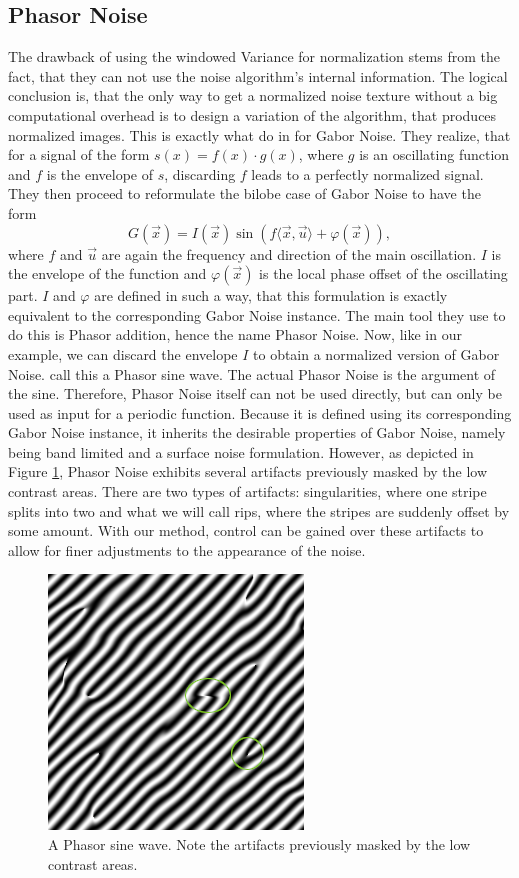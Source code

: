 \documentclass{utue} %
\begin{document}
\subsection{Phasor Noise}\label{sec:phasorNoise}
The drawback of using the windowed Variance for normalization stems from the fact, that they can not use the noise algorithm's internal information. The logical conclusion is, that the only way to get a normalized noise texture without a big computational overhead is to design a variation of the algorithm, that produces normalized images. This is exactly what \citeauthor{phasorNoise} do in \cite{phasorNoise} for Gabor Noise. They realize, that for a signal of the form $s(x) = f(x)\cdot g(x)$, where $g$ is an oscillating function and $f$ is the envelope of $s$, discarding $f$ leads to a perfectly normalized signal. They then proceed to reformulate the bilobe case of Gabor Noise to have the form
$$
G(\vec{x}) = I(\vec{x})\sin{(f\langle\vec{x},\vec{u}\rangle + \varphi(\vec{x}))},
$$
where $f$ and $\vec{u}$ are again the frequency and direction of the main oscillation. $I$ is the envelope of the function and $\varphi(\vec{x})$ is the local phase offset of the oscillating part. $I$ and $\varphi$ are defined in such a way, that this formulation is exactly equivalent to the corresponding Gabor Noise instance. The main tool they use to do this is Phasor addition, hence the name Phasor Noise. Now, like in our example, we can discard the envelope $I$ to obtain a normalized version of Gabor Noise. \citeauthor{phasorNoise} call this a Phasor sine wave. The actual Phasor Noise is the argument of the sine. Therefore, Phasor Noise itself can not be used directly, but can only be used as input for a periodic function. Because it is defined using its corresponding Gabor Noise instance, it inherits the desirable properties of Gabor Noise, namely being band limited and a surface noise formulation. However, as depicted in Figure \ref{fig:phasorNoise}, Phasor Noise exhibits several artifacts previously masked by the low contrast areas. There are two types of artifacts: singularities, where one stripe splits into two and what we will call rips, where the stripes are suddenly offset by some amount. With our method, control can be gained over these artifacts to allow for finer adjustments to the appearance of the noise.

\begin{figure}[ht]
  \centering
  \includegraphics[width = 0.49\linewidth]{images/phasorSineWave}
  \caption{A Phasor sine wave. Note the artifacts previously masked by the low contrast areas.}\label{fig:phasorNoise}
\end{figure}
\end{document}
